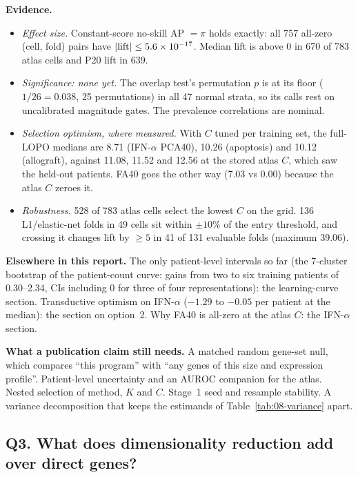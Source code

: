 \textbf{Evidence.}
\begin{itemize}
\item \emph{Effect size.} Constant-score no-skill AP $=\pi$ holds exactly: all 757 all-zero (cell, fold) pairs have $|\mathrm{lift}|\leq5.6\times10^{-17}$. Median lift is above 0 in 670 of 783 atlas cells and P20 lift in 639. 
\item \emph{Significance: none yet.} The overlap test's permutation $p$ is at its floor ($1/26=0.038$, 25 permutations) in all 47 normal strata, so its calls rest on uncalibrated magnitude gates. The prevalence correlations are nominal. 
\item \emph{Selection optimism, where measured.} With $C$ tuned per training set, the full-LOPO medians are 8.71 (IFN-$\alpha$ PCA40), 10.26 (apoptosis) and 10.12\pp{} (allograft), against 11.08, 11.52 and 12.56\pp{} at the stored atlas $C$, which saw the held-out patients. FA40 goes the other way (7.03 vs 0.00\pp) because the atlas $C$ zeroes it. 
\item \emph{Robustness.} 528 of 783 atlas cells select the lowest $C$ on the grid. 136 L1/elastic-net folds in 49 cells sit within $\pm10\%$ of the entry threshold, and crossing it changes lift by $\geq5$\pp{} in 41 of 131 evaluable folds (maximum 39.06\pp). 
\end{itemize}
\textbf{Elsewhere in this report.} The only patient-level intervals so far (the 7-cluster bootstrap of the patient-count curve: gains from two to six training patients of 0.30--2.34\pp, CIs including 0 for three of four representations): the learning-curve section. Transductive optimism on IFN-$\alpha$ ($-1.29$ to $-0.05$\pp{} per patient at the median): the section on option~2. Why FA40 is all-zero at the atlas $C$: the IFN-$\alpha$ section.

\textbf{What a publication claim still needs.} A matched random gene-set null, which compares ``this program'' with ``any genes of this size and expression profile''. Patient-level uncertainty and an AUROC companion for the atlas. Nested selection of method, $K$ and $C$. Stage~1 seed and resample stability. A variance decomposition that keeps the estimands of Table~\ref{tab:08-variance} apart.

\subsection{Q3. What does dimensionality reduction add over direct genes?}

